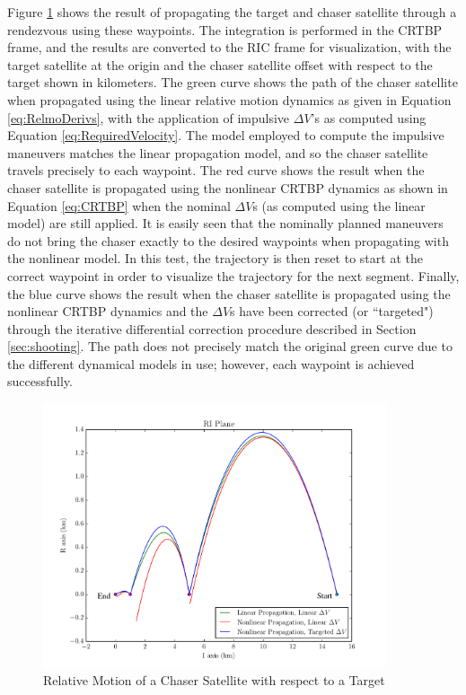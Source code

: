 \documentclass[a4paper]{article}
\begin{document}
Figure \ref{fig:RIC_1} shows the result of propagating the target and chaser satellite through a rendezvous using these waypoints.  The integration is performed in the CRTBP frame, and the results are converted to the RIC frame for visualization, with the target satellite at the origin and the chaser satellite offset with respect to the target shown in kilometers.  The green curve shows the path of the chaser satellite when propagated using the linear relative motion dynamics as given in Equation \ref{eq:RelmoDerivs}, with the application of impulsive \(\Delta V\)'s as computed using Equation \ref{eq:RequiredVelocity}.  The model employed to compute the impulsive maneuvers matches the linear propagation model, and so the chaser satellite travels precisely to each waypoint.  The red curve shows the result when the chaser satellite is propagated using the nonlinear CRTBP dynamics as shown in Equation \ref{eq:CRTBP} when the nominal \(\Delta V\)s (as computed using the linear model) are still applied.  It is easily seen that the nominally planned maneuvers do not bring the chaser exactly to the desired waypoints when propagating with the nonlinear model. In this test, the trajectory is then reset to start at the correct waypoint in order to visualize the trajectory for the next segment. Finally, the blue curve shows the result when the chaser satellite is propagated using the nonlinear CRTBP dynamics and the \(\Delta V\)s have been corrected (or ``targeted") through the iterative differential correction procedure described in Section \ref{sec:shooting}.  The path does not precisely match the original green curve due to the different dynamical models in use; however, each waypoint is achieved successfully.  %

\begin{figure}[h] 
	\begin{center}
		\includegraphics[width=0.9\textwidth]{RIC_1}
		\caption{Relative Motion of a Chaser Satellite with respect to a Target}
		\label{fig:RIC_1}
	\end{center}
\end{figure} %
\end{document}
